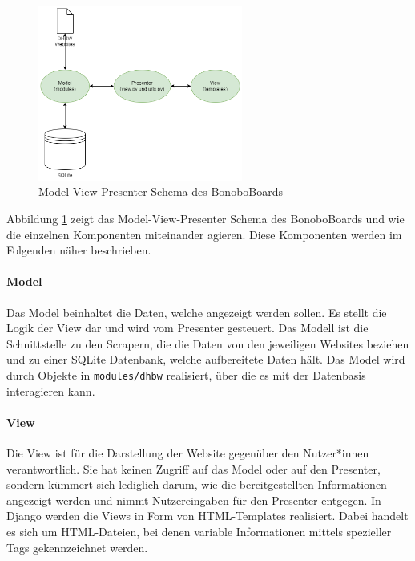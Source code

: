 \documentclass[a4paper,11pt]{scrartcl}
\begin{document}
\begin{figure}[H]
\begin{center}
	\includegraphics[width=0.6\textwidth]{MVP}
	\caption{Model-View-Presenter Schema des BonoboBoards}
	\label{img:MVP}
\end{center}
\end{figure}


\noindent Abbildung \ref{img:MVP} zeigt das Model-View-Presenter Schema des BonoboBoards und wie die einzelnen Komponenten miteinander agieren. Diese Komponenten werden im Folgenden näher beschrieben.

\paragraph{Model}
Das Model beinhaltet die Daten, welche angezeigt werden sollen. Es stellt die Logik der View dar und wird vom Presenter gesteuert. Das Modell ist die Schnittstelle zu den Scrapern, die die Daten von den jeweiligen Websites beziehen und zu einer SQLite Datenbank, welche aufbereitete Daten hält. Das Model wird durch Objekte in \texttt{modules/dhbw} realisiert, über die es mit der Datenbasis interagieren kann.

\paragraph{View}
Die View ist für die Darstellung der Website gegenüber den Nutzer*innen verantwortlich. Sie hat keinen Zugriff auf das Model oder auf den Presenter, sondern kümmert sich lediglich darum, wie die bereitgestellten Informationen angezeigt werden und nimmt Nutzereingaben für den Presenter entgegen. In Django werden die Views in Form von HTML-Templates realisiert. Dabei handelt es sich um HTML-Dateien, bei denen variable Informationen mittels spezieller Tags gekennzeichnet werden.
\end{document}

